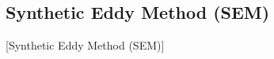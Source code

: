 \subsection{Synthetic Eddy Method (SEM)}%
\label{SEC:SEM}%
[Synthetic Eddy Method (SEM)]


\begingroup

  \newcommand{\smallSub}[1]{\ensuremath{\textsc{#1}}}
  \newcommand{\subBC}{\smallSub{bc}}
  \newcommand{\subSEM}{\smallSub{sem}}
  \newcommand{\smallSubSub}[1]{\ensuremath{{_{#1}}}}
  \newcommand{\subsubBC}{\smallSubSub{\textrm{BC}}}
  \newcommand{\subsubSEM}{\smallSubSub{\textrm{SEM}}}

  \newcommand{\uSEM}{\ensuremath{U_\subSEM}}
  \newcommand{\uBC}{\ensuremath{U_\smallSub{bl}}}
  \newcommand{\lSEM}{\ensuremath{l_\subSEM}}
  \newcommand{\hSEM}{\ensuremath{h_\subSEM}}

  \newcommand{\volume}{\ensuremath{\mathscr{V}}}

  \newcommand{\vSEM}{\ensuremath{\volume_\subSEM}}           %
  \newcommand{\vEddy}{\ensuremath{\volume_{\mathrm{eddy}}}}  %

  \newcommand{\lBC}{\ensuremath{\delta_\smallSub{bl}}}

